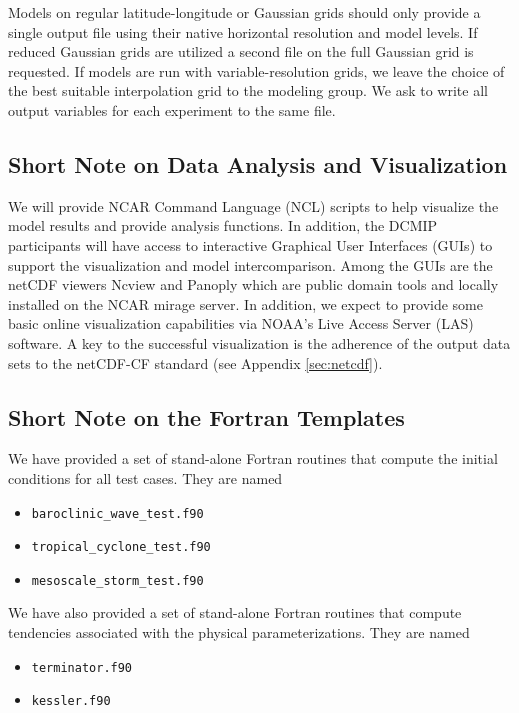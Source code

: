 \documentclass[times,doublespace]{fldauth}
\begin{document}
Models on regular latitude-longitude or Gaussian grids should only provide a single output file using their native horizontal resolution and model levels. If reduced Gaussian grids are utilized a second file on the full Gaussian grid is requested. 
If models are run with variable-resolution grids, we leave the choice of the best suitable interpolation grid to the modeling group. We ask to write all output variables for each experiment to the same file.

\subsection{Short Note on Data Analysis and Visualization}
We will provide NCAR Command Language (NCL) scripts to help visualize the model results and provide analysis functions. In addition, the DCMIP participants will have access to interactive Graphical User Interfaces (GUIs) to support the visualization and model intercomparison. Among the GUIs are the netCDF viewers Ncview and Panoply which are public domain tools and locally installed on the NCAR mirage server. In addition, we expect to provide some basic online visualization capabilities via NOAA's Live Access Server (LAS) software. A key to the successful visualization is the adherence of the output data sets to the netCDF-CF standard (see Appendix \ref{sec:netcdf}).

\subsection{Short Note on the Fortran Templates}
\label{sec:template}
We have provided a set of stand-alone Fortran routines that compute the initial conditions for all test cases. They are named

\begin{itemize}
\item \texttt{baroclinic\_wave\_test.f90}
\item \texttt{tropical\_cyclone\_test.f90}
\item \texttt{mesoscale\_storm\_test.f90}
\end{itemize}

We have also provided a set of stand-alone Fortran routines that compute tendencies associated with the physical parameterizations.  They are named

\begin{itemize}
\item \texttt{terminator.f90}
\item \texttt{kessler.f90}
\end{itemize}
\end{document}
